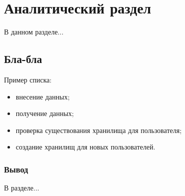 \section{Аналитический раздел}
В данном разделе...

\subsection{Бла-бла}
Пример списка:
\begin{itemize}[leftmargin=1.6\parindent]
\item внесение данных;
\item получение данных;
\item проверка существования хранилища для пользователя;
\item создание хранилищ для новых пользователей.
\end{itemize}

\subsubsection*{Вывод}
В разделе...

\pagebreak